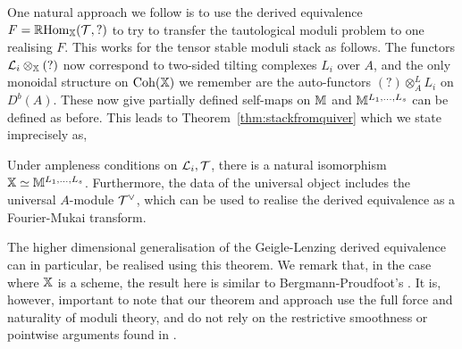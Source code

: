 \documentclass[12pt]{amsart}
\begin{document}
One natural approach we follow is to use the derived equivalence $F = \mathop{\mathbb{R}\mathrm{Hom}}\nolimits_{\mathbb{X}}(\mathcal{T},?)$ to try to transfer the tautological moduli problem to one realising $F$. This works for the tensor stable moduli stack as follows. The functors $\mathcal{L}_i \otimes_{\mathbb{X}}(?)$ now correspond to two-sided tilting complexes $L_i$ over $A$, and the only monoidal structure on $\operatorname{Coh}(\mathbb{X})$ we remember are the auto-functors $(?) \otimes^L_A L_i$ on $D^b(A)$. These now give partially defined self-maps on $\mathbb{M}$ and $\mathbb{M}^{L_1,\ldots,L_s}$ can be defined as before. This leads to Theorem~\ref{thm:stackfromquiver} which we state imprecisely as,
\begin{theorem}  \label{thm:2}
Under ampleness conditions on $\mathcal{L}_i, \mathcal{T}$, there is a natural isomorphism  $\mathbb{X} \simeq \mathbb{M}^{L_1,\ldots,L_s}$. Furthermore, the data of the universal object includes the universal $A$-module $\mathcal{T}^{\vee}$, which can be used to realise the derived equivalence as a Fourier-Mukai transform. 
\end{theorem}
The higher dimensional generalisation \cite{HIMO} of the Geigle-Lenzing derived equivalence can in particular, be realised using this theorem. 
We remark that, in the case where $\mathbb{X}$ is a scheme, the result here is similar to Bergmann-Proudfoot's \cite{MR2421120}. It is, however, important to note that our theorem and approach use the full force and naturality of moduli theory, and do not rely on the restrictive smoothness or pointwise arguments found in \cite{MR2421120}.
\end{document}
